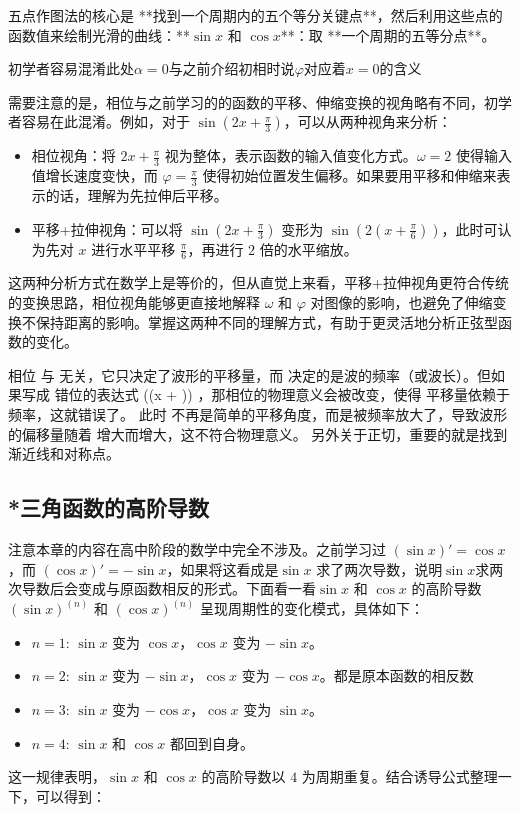 五点作图法的核心是 **找到一个周期内的五个等分关键点**，然后利用这些点的函数值来绘制光滑的曲线：**$\sin x$ 和 $\cos x$**：取 **一个周期的五等分点**。

初学者容易混淆此处$\alpha=0$与之前介绍初相时说$\varphi$对应着$x=0$的含义


需要注意的是，相位与之前学习的的函数的平移、伸缩变换的视角略有不同，初学者容易在此混淆。例如，对于 $\displaystyle\sin(2x + \frac{\pi}{3})$，可以从两种视角来分析：
\begin{itemize}
\item 相位视角：将 $\displaystyle2x + \frac{\pi}{3}$ 视为整体，表示函数的输入值变化方式。$\omega = 2$ 使得输入值增长速度变快，而 $\displaystyle\varphi = \frac{\pi}{3}$ 使得初始位置发生偏移。如果要用平移和伸缩来表示的话，理解为先拉伸后平移。
\item 平移+拉伸视角：可以将 $\displaystyle\sin(2x + \frac{\pi}{3})$ 变形为 $\displaystyle\sin\left(2(x + \frac{\pi}{6})\right)$，此时可认为先对 $x$ 进行水平平移 $\displaystyle\frac{\pi}{6}$，再进行 $2$ 倍的水平缩放。
\end{itemize}

这两种分析方式在数学上是等价的，但从直觉上来看，平移+拉伸视角更符合传统的变换思路，相位视角能够更直接地解释 $\omega$ 和 $\varphi$ 对图像的影响，也避免了伸缩变换不保持距离的影响。掌握这两种不同的理解方式，有助于更灵活地分析正弦型函数的变化。

相位  \phi  与  \omega  无关，它只决定了波形的平移量，而  \omega  决定的是波的频率（或波长）。但如果写成 错位的表达式  \sin(\omega(x + \phi)) ，那相位的物理意义会被改变，使得 平移量依赖于频率，这就错误了。
此时  \phi  不再是简单的平移角度，而是被频率放大了，导致波形的偏移量随着  \omega  增大而增大，这不符合物理意义。
另外关于正切，重要的就是找到渐近线和对称点。



\subsection{*三角函数的高阶导数}
注意本章的内容在高中阶段的数学中完全不涉及。之前学习过 $(\sin x)' = \cos x$，而 $(\cos x)' = -\sin x$，如果将这看成是$\sin x$ 求了两次导数，说明$\sin x$求两次导数后会变成与原函数相反的形式。下面看一看$\sin x$ 和 $\cos x$ 的高阶导数$(\sin x)^{(n)}$ 和 $(\cos x)^{(n)}$ 呈现周期性的变化模式，具体如下：
\begin{itemize}
\item $n = 1$: $\sin x$ 变为 $\cos x$，$\cos x$ 变为 $-\sin x$。
\item $n = 2$: $\sin x$ 变为 $-\sin x$，$\cos x$ 变为 $-\cos x$。都是原本函数的相反数
\item $n = 3$: $\sin x$ 变为 $-\cos x$，$\cos x$ 变为 $\sin x$。
\item $n = 4$: $\sin x$ 和 $\cos x$ 都回到自身。
\end{itemize}
这一规律表明，$\sin x$ 和 $\cos x$ 的高阶导数以 $4$ 为周期重复。结合诱导公式整理一下，可以得到：

